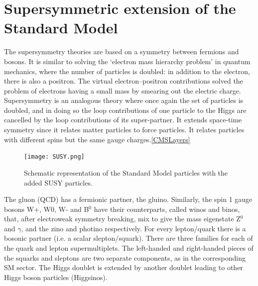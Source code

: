 \section{Supersymmetric extension of the Standard Model}

The supersymmetry theories are based on a symmetry between fermions and bosons. It is similar to solving the `electron mass hierarchy problem' in quantum mechanics, where the number of particles is doubled: in addition to the electron, there is also a positron. The virtual electron--positron contributions solved the problem of electrons having a small mass by smearing out the electric charge. Supersymmetry is an analogous theory where once again the set of particles is doubled, and in doing so the loop contributions of one particle to the Higgs are cancelled by the loop contributions of its super-partner. It extends space-time symmetry since it relates matter particles to force particles. It relates particles with different spins but the same gauge charges.\autoref{CMSLayers}

\begin{figure}[H]
\begin{center}
\texttt{[image: SUSY.png]} 
\caption[Schematic representation of the Standard Model particles with the added SUSY particles.]{Schematic representation of the Standard Model particles with the added SUSY particles.}
\label{SUSY} 
\end{center}
\end{figure}

The gluon (QCD) has a fermionic partner, the gluino. Similarly, the spin 1 gauge bosons W+, W0, W- and B$^0$ have their counterparts, called winos and binos, that, after electroweak symmetry breaking, mix to give the mass eigenstate Z$^0$ and $\gamma$, and the zino and photino respectively. For every lepton/quark there is a bosonic partner (i.e. a scalar slepton/squark). There are three families for each of the quark and lepton supermultiplets. The left-handed and right-handed pieces of the squarks and sleptons are two separate components, as in the corresponding SM sector. The Higgs doublet is extended by another doublet leading to other Higgs boson particles (Higgsinos).\\

